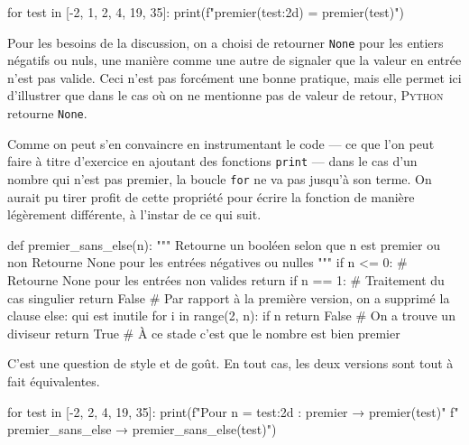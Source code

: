 \begin{idleconsole}
\begin{pyconsole}
for test in [-2, 1, 2, 4, 19, 35]:
    print(f"premier({test:2d}) = {premier(test)}")

\end{pyconsole}
\end{idleconsole}
\vspace{4pt}

Pour les besoins de la discussion, on a choisi de retourner \texttt{None} pour les entiers négatifs ou nuls, une manière comme une autre de signaler que la valeur en entrée n'est pas valide. Ceci n'est pas forcément une bonne pratique, mais elle permet ici d'illustrer que dans le cas où on ne mentionne pas de valeur de retour, \textsc{Python} retourne \texttt{None}.

Comme on peut s'en convaincre en instrumentant le code --- ce que l'on peut faire à titre d'exercice en ajoutant des fonctions \texttt{print} --- dans le cas d'un nombre qui n'est pas premier, la boucle \texttt{for} ne va pas jusqu'à son terme.
On aurait pu tirer profit de cette propriété pour écrire la fonction de manière légèrement différente, à l'instar de ce qui suit.

\begin{idleconsole*}
\begin{pyconsole}
def premier_sans_else(n):
    """
    Retourne un booléen selon que n est premier ou non
    Retourne None pour les entrées négatives ou nulles
    """
    if n <= 0: # Retourne None pour les entrées non valides
        return
    if n == 1: # Traitement du cas singulier
        return False
    # Par rapport à la première version, on a supprimé la clause else: qui est inutile
    for i in range(2, n):
        if n %
            return False # On a trouve un diviseur
    return True # À ce stade c'est que le nombre est bien premier

\end{pyconsole}
\end{idleconsole*}


C'est une question de style et de goût. En tout cas, les deux versions sont tout à fait équivalentes.

\begin{idleconsole}
\begin{pyconsole}
for test in [-2, 2, 4, 19, 35]:
    print(f"Pour n = {test:2d} : premier → {premier(test)}\n"
          f"    premier_sans_else → {premier_sans_else(test)}\n")

\end{pyconsole}
\end{idleconsole}

